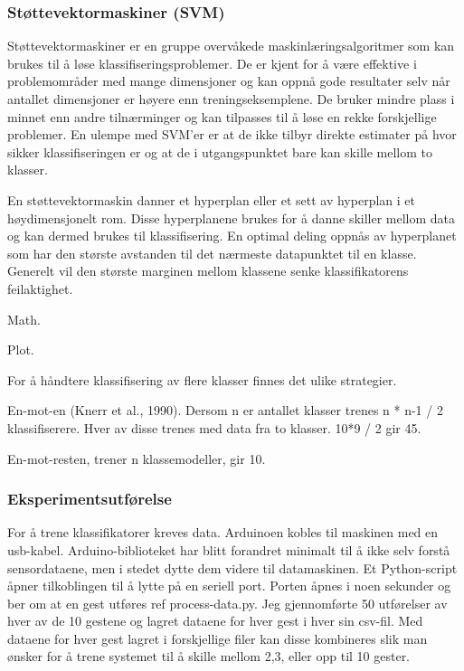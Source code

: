 \subsubsection*{Støttevektormaskiner (SVM)}
Støttevektormaskiner er en gruppe overvåkede maskinlæringsalgoritmer som kan brukes til å løse klassifiseringsproblemer. De er kjent for å være effektive i problemområder med mange dimensjoner og kan oppnå gode resultater selv når antallet dimensjoner er høyere enn treningseksemplene. De bruker mindre plass i minnet enn andre tilnærminger og kan tilpasses til å løse en rekke forskjellige problemer. En ulempe med SVM'er er at de ikke tilbyr direkte estimater på hvor sikker klassifiseringen er og at de i utgangspunktet bare kan skille mellom to klasser.

En støttevektormaskin danner et hyperplan eller et sett av hyperplan i et høydimensjonelt rom. Disse hyperplanene brukes for å danne skiller mellom data og kan dermed brukes til klassifisering. En optimal deling oppnås av hyperplanet som har den største avstanden til det nærmeste datapunktet til en klasse. Generelt vil den største marginen mellom klassene senke klassifikatorens feilaktighet.

Math.

Plot.

For å håndtere klassifisering av flere klasser finnes det ulike strategier.

En-mot-en (Knerr et al., 1990). Dersom n er antallet klasser trenes n * n-1 / 2 klassifiserere. Hver av disse trenes med data fra to klasser. 10*9 / 2 gir 45.

En-mot-resten, trener n klassemodeller, gir 10.

\subsubsection{Eksperimentsutførelse}
For å trene klassifikatorer kreves data. Arduinoen kobles til maskinen med en usb-kabel. Arduino-biblioteket har blitt forandret minimalt til å ikke selv forstå sensordataene, men i stedet dytte dem videre til datamaskinen. Et Python-script åpner tilkoblingen til å lytte på en seriell port. Porten åpnes i noen sekunder og ber om at en gest utføres {\color{red} ref process-data.py}. Jeg gjennomførte 50 utførelser av hver av de 10 gestene og lagret dataene for hver gest i hver sin csv-fil. Med dataene for hver gest lagret i forskjellige filer kan disse kombineres slik man ønsker for å trene systemet til å skille mellom 2,3, eller opp til 10 gester. 

